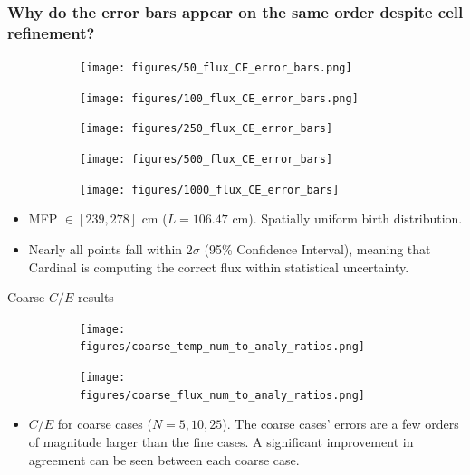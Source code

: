 \documentclass[9pt,t]{beamer}
\begin{document}
\begin{frame}
    \frametitle{Why do the error bars appear on the same order despite cell refinement?}
        \begin{figure}[T]
            \centering
            \begin{subfigure}{0.32\textwidth}
                \texttt{[image: figures/50\_flux\_CE\_error\_bars.png]}
            \end{subfigure}
            \begin{subfigure}{0.32\textwidth}
                \texttt{[image: figures/100\_flux\_CE\_error\_bars.png]}
            \end{subfigure}
            \begin{subfigure}{0.32\textwidth}
                \texttt{[image: figures/250\_flux\_CE\_error\_bars]}
            \end{subfigure}
            \begin{subfigure}{0.32\textwidth}
                \texttt{[image: figures/500\_flux\_CE\_error\_bars]}
            \end{subfigure}
            \begin{subfigure}{0.32\textwidth}
                \texttt{[image: figures/1000\_flux\_CE\_error\_bars]}
            \end{subfigure}
        \end{figure}
        \begin{itemize}
            \item <3-> MFP $\in[239,278]$ cm ($L=106.47$ cm). Spatially uniform birth distribution.
            \item <4-> Nearly all points fall within $2\sigma$ (95\% Confidence Interval), meaning that Cardinal is computing the correct flux within statistical uncertainty.
        \end{itemize}
    \end{frame}
    

\begin{frame}{Coarse $C/E$ results}
    \begin{figure}[T]
        \begin{subfigure}{0.475\linewidth}
            \texttt{[image: figures/coarse\_temp\_num\_to\_analy\_ratios.png]}
        \end{subfigure}\hspace{0.3cm}
        \begin{subfigure}{0.475\linewidth}
            \texttt{[image: figures/coarse\_flux\_num\_to\_analy\_ratios.png]}
        \end{subfigure}
    \end{figure}
    \begin{itemize}
        \item $C/E$ for coarse cases ($N=5,10,25$). The coarse cases' errors are a few orders of magnitude larger than the fine cases. A significant improvement in agreement can be seen between each coarse case.
    \end{itemize}
\end{frame}
\end{document}
